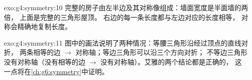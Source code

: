 \begin{solution}{exo:g4:symmetry:10}
完整的房子由左半边及其对称像组成：墙面宽度是半面墙的两倍，
上面是完整的三角形屋顶。
右边的每一条长度都与左边对应的长度相等，
对称会精确地复制长度。
\end{solution}

\begin{solution}{exo:g4:symmetry:11}
图中的画法说明了两种情况：等腰三角形沿经过顶点的直线对折，
两条相等的边 $\to$ 对称轴；等边三角形可以沿三个方向对折；
不等边三角形没有对称轴（没有相等的边
$\to$ 没有对称轴）。艾雅的两个结论都是正确的，
这一点将在\cref{ch:g6:symmetry}中证明。
\end{solution}
